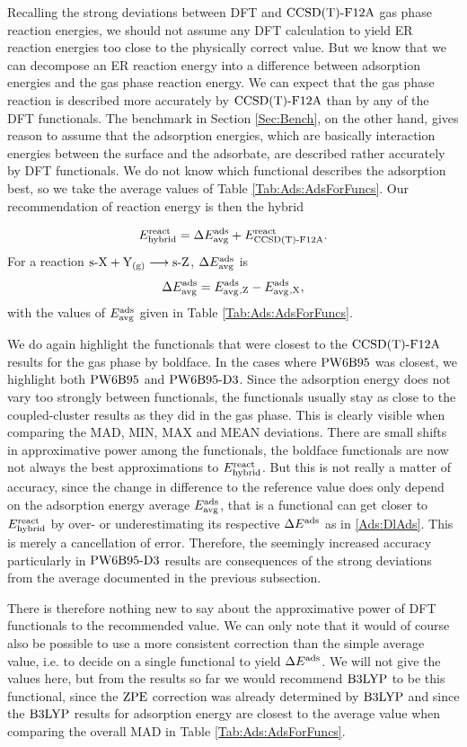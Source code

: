 \documentclass[8.5pt,twoside,twocolumn]{article}
\newcommand\zpe{\enmat{\te{ZPE}}}
\newcommand\eads{\enmat{E^{\te{ads}}}}
\newcommand\ere{\enmat{E^{\te{react}}}}
\newcommand\sur{\enmat{\te{s-}}}
\newcommand\gas{\enmat{_\te{(g)}}}
\theoremstyle{standard}
\begin{document}
Recalling the strong deviations between DFT and $\text{CCSD(T)-F12A}$ gas phase
reaction energies, we should not assume any DFT calculation to yield
ER reaction energies too close to the physically correct value. But we know
that we can decompose an ER reaction energy into a difference between
adsorption energies and the gas phase reaction energy. We can expect that
the gas phase reaction is described more accurately by $\text{CCSD(T)-F12A}$ than by
any of the DFT functionals. The benchmark in Section \ref{Sec:Bench}, on
the other hand, gives reason to assume that the adsorption energies, which
are basically interaction energies between the surface and the adsorbate,
are described rather accurately by DFT functionals. We do not know which
functional describes the adsorption best, so we take the average values
of Table \ref{Tab:Ads:AdsForFuncs}. Our recommendation of reaction
energy is then the hybrid

\begin{equation}
 \erehyb=\Dl\avg + \ere_{\ccsdtf}.
\end{equation}
For a reaction $\sur\X+\Y\gas\chemar\sur\Z$, $\Delta E_{\text {avg}}^{\text{ads}}$ is
\begin{equation}
 \Delta E_{\text {avg}}^{\text{ads}} = E_{\text {avg}}^{\text{ads}}{_{,\text Z}} - E_{\text {avg}}^{\text{ads}}{_{,\text X}},
 \label{Ads:DlAds}
\end{equation}
with the values of $E_{\text {avg}}^{\text{ads}}$ given in Table \ref{Tab:Ads:AdsForFuncs}. 

We do again highlight the functionals that were closest to the $\text{CCSD(T)-F12A}$
results for the gas phase by boldface. In the cases where $\text{PW6B95}$ was closest,
we highlight both $\text{PW6B95}$ and $\text{PW6B95}\text{-D3}$. Since the adsorption energy does not vary too 
strongly between functionals, the functionals usually stay 
as close to the coupled-cluster results as they did in the gas phase. This
is clearly visible when comparing the MAD, MIN, MAX and MEAN deviations.
There are small shifts in approximative power among the functionals,
the boldface functionals are now not always the best approximations to
$\erehyb$.
But this is not really a matter of accuracy, since the change in difference
to the reference value does only depend on the adsorption energy average $E_{\text {avg}}^{\text{ads}}$,
that is a functional can get closer to $\erehyb$ by over- or underestimating
its respective $\Dl\eads$ as in \eqref{Ads:DlAds}. This is merely a cancellation
of error. Therefore, the seemingly increased accuracy particularly in
$\text{PW6B95}\text{-D3}$ results are consequences of the strong deviations from the average
documented in the previous subsection.

There is therefore nothing new to say about the approximative power of DFT
functionals to the recommended value. We can only note that it would
of course also be possible to use a more consistent correction than the simple
average value, i.e. to decide on a single functional to yield $\Dl\eads$.
We will not give the values here, but from the results so far we would
recommend $\text{B3LYP}$ to be this functional, since the $\zpe$ correction
was already determined by $\text{B3LYP}$ and since the $\text{B3LYP}$ results for
adsorption energy are closest to the average value when comparing the
overall MAD in Table \ref{Tab:Ads:AdsForFuncs}. 
\end{document}
